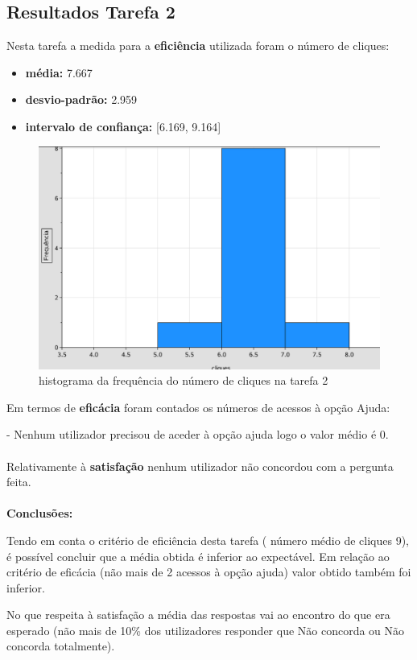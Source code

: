 \documentclass{article}
\begin{document}
\subsection*{Resultados Tarefa 2}
Nesta tarefa a medida para a \textbf{eficiência} utilizada foram o número de cliques:
\begin{itemize}
\item\textbf{média:} 7.667
\item\textbf{desvio-padrão:} 2.959
\item\textbf{intervalo de confiança:} [6.169, 9.164]
\end{itemize}
\begin{figure}[H]
\centering
\includegraphics[scale=0.35]{grafico2}
\caption{histograma da frequência do número de cliques na tarefa 2}
\end{figure} Em termos de \textbf{eficácia} foram contados os números de acessos à opção Ajuda:

 - Nenhum utilizador precisou de aceder à opção ajuda logo o valor médio é 0.\\\\
Relativamente à \textbf{satisfação} nenhum utilizador não concordou com a pergunta feita.\\\\
\textbf{Conclusões:}

Tendo em conta o critério de eficiência desta tarefa ( número médio de cliques 9), é possível concluir que a média obtida é inferior ao expectável. Em relação ao critério de eficácia (não mais de 2 acessos à opção ajuda) valor obtido também foi inferior.

No que respeita à satisfação a média das respostas vai ao encontro do que era esperado (não mais de 10\% dos utilizadores responder que Não concorda ou Não concorda totalmente).
\end{document}

